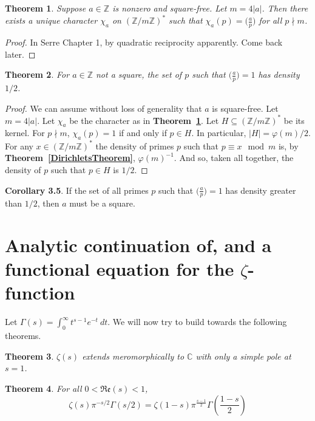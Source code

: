\documentclass[12pt]{article}
\newcommand{\ints}{\mathbb{Z}}
\newcommand{\complex}{\mathbb{C}}
\newcommand{\intsmod}[1]{\ints / #1 \ints}
\newcommand{\tref}[1]{\textbf{Theorem~\ref{#1}}}
\newtheorem{thm}{Theorem}
\numberwithin{equation}{section}
\numberwithin{thm}{section}
\numberwithin{lemma}{section}
\numberwithin{cor}{section}
\begin{document}
\begin{thm}\label{CharacterExtensionOfLegendreSymbol}
  Suppose $a \in \ints$ is nonzero and square-free. Let $m = 4 |a|$. Then there exists a unique character $\chi_a$ on $(\intsmod{m})^*$ such that $\chi_a(p) = \big(\frac{a}{p}\big)$ for all $p \nmid m$.
\end{thm}
\begin{proof}
  In Serre Chapter 1, by quadratic reciprocity apparently. Come back later.
\end{proof}

\begin{thm}\label{PrimeSquaresHaveHalfDensity}
  For $a \in \ints$ not a square, the set of $p$ such that $\big(\frac{a}{p} \big) = 1$ has density $1/2$.
\end{thm}
\begin{proof}
  We can assume without loss of generality that $a$ is square-free. Let $m = 4 |a|$. Let $\chi_a$ be the character as in \tref{CharacterExtensionOfLegendreSymbol}. Let $H \subseteq (\intsmod{m})^*$ be its kernel. For $p \nmid m$, $\chi_a(p) = 1$ if and only if $p \in H$. In particular, $|H| = \varphi(m)/2$. For any $x \in (\intsmod{m})^*$ the density of primes $p$ such that $p \equiv x \mod m$ is, by \tref{DirichletsTheorem}, $\varphi(m)^{-1}$. And so, taken all together, the density of $p$ such that $p \in H$ is $1/2$.
\end{proof}

\textbf{Corollary 3.5}. If the set of all primes $p$ such that $\big( \frac{a}{p} \big) = 1$ has density greater than $1/2$, then $a$ must be a square.

\section{Analytic continuation of, and a functional equation for the $\zeta$-function}

Let $\Gamma(s) = \int_0^{\infty} t^{s-1} e^{-t} \ dt$. We will now try to build towards the following theorems.

\begin{thm}\label{ZetaIsMeromorphic}
  $\zeta(s)$ extends meromorphically to $\complex$ with only a simple pole at $s = 1$.
\end{thm}

\begin{thm}\label{ZetaFunctionalEquation}
  For all $0 < \mathfrak{Re}(s) < 1$, \begin{equation*}
    \zeta(s) \pi^{-s/2} \Gamma(s/2) = \zeta(1 - s) \pi^{\frac{s-1}{2}}\Gamma \left( \frac{1-s}{2} \right)
  \end{equation*}
\end{thm}
\end{document}
